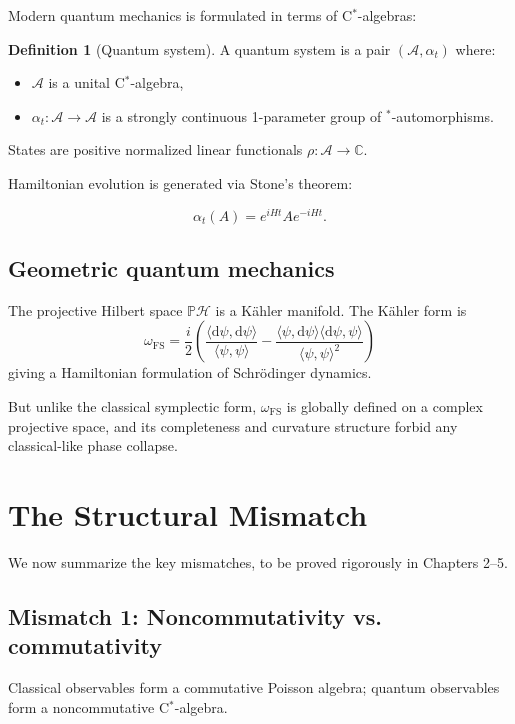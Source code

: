 \documentclass[12pt,oneside]{book}
\theoremstyle{plain}
\theoremstyle{definition}
\newtheorem{definition}[theorem]{Definition}
\begin{document}
Modern quantum mechanics is formulated in terms of C$^\ast$-algebras:

\begin{definition}[Quantum system]
A quantum system is a pair $(\mathcal{A}, \alpha_t)$ where:
\begin{itemize}
\item $\mathcal{A}$ is a unital C$^\ast$-algebra,
\item $\alpha_t : \mathcal{A} \to \mathcal{A}$ is a strongly continuous 1-parameter group of $^\ast$-automorphisms.
\end{itemize}
\end{definition}

States are positive normalized linear functionals $\rho:\mathcal{A}\to\mathbb{C}$.

Hamiltonian evolution is generated via Stone’s theorem:

\[
\alpha_t(A) = e^{iHt} A e^{-iHt}.
\]

\subsection{Geometric quantum mechanics}

The projective Hilbert space $\mathbb{P}\mathcal{H}$ is a Kähler manifold.
The Kähler form is
\[
\omega_{\mathrm{FS}} = \frac{i}{2}\left(
\frac{\langle \mathrm{d}\psi, \mathrm{d}\psi \rangle}{\langle\psi,\psi\rangle}
-
\frac{\langle\psi,\mathrm{d}\psi\rangle \langle\mathrm{d}\psi,\psi\rangle}{\langle\psi,\psi\rangle^2}
\right)
\]
giving a Hamiltonian formulation of Schrödinger dynamics.

But unlike the classical symplectic form, $\omega_{\mathrm{FS}}$ is globally defined on a complex projective space, and its completeness and curvature structure forbid any classical-like phase collapse.

\section{The Structural Mismatch}

We now summarize the key mismatches, to be proved rigorously in Chapters 2–5.

\subsection{Mismatch 1: Noncommutativity vs. commutativity}

Classical observables form a commutative Poisson algebra; quantum observables form a noncommutative C$^\ast$-algebra.
\end{document}
